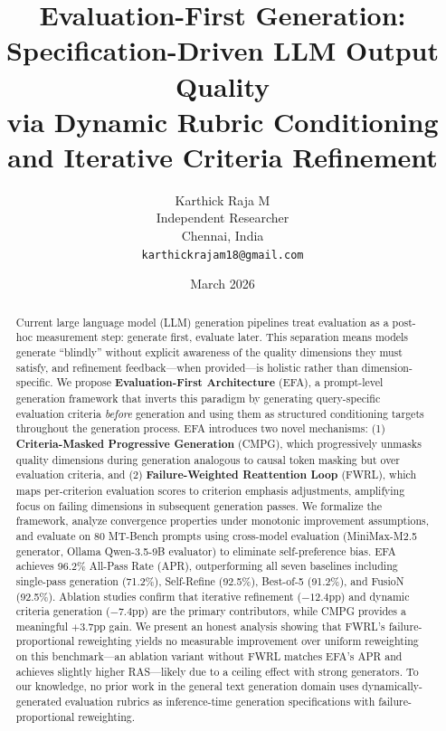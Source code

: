 \documentclass[11pt]{article}
\title{\textbf{Evaluation-First Generation: Specification-Driven LLM Output Quality \\ via Dynamic Rubric Conditioning and Iterative Criteria Refinement}}
\author{
Karthick Raja M \\
Independent Researcher \\
Chennai, India \\
\texttt{karthickrajam18@gmail.com}
}
\date{March 2026}
\newcommand{\efa}{\textsc{EFA}}  %
\newcommand{\cmpg}{\textsc{CMPG}}
\newcommand{\fwrl}{\textsc{FWRL}}
\begin{document}
\maketitle

\begin{abstract}
Current large language model (LLM) generation pipelines treat evaluation as a post-hoc measurement step: generate first, evaluate later. This separation means models generate ``blindly'' without explicit awareness of the quality dimensions they must satisfy, and refinement feedback---when provided---is holistic rather than dimension-specific. We propose \textbf{Evaluation-First Architecture} (\efa{}), a prompt-level generation framework that inverts this paradigm by generating query-specific evaluation criteria \emph{before} generation and using them as structured conditioning targets throughout the generation process. \efa{} introduces two novel mechanisms: (1) \textbf{Criteria-Masked Progressive Generation} (\cmpg{}), which progressively unmasks quality dimensions during generation analogous to causal token masking but over evaluation criteria, and (2) \textbf{Failure-Weighted Reattention Loop} (\fwrl{}), which maps per-criterion evaluation scores to criterion emphasis adjustments, amplifying focus on failing dimensions in subsequent generation passes. We formalize the framework, analyze convergence properties under monotonic improvement assumptions, and evaluate on 80 MT-Bench prompts using cross-model evaluation (MiniMax-M2.5 generator, Ollama Qwen-3.5-9B evaluator) to eliminate self-preference bias. \efa{} achieves 96.2\% All-Pass Rate (APR), outperforming all seven baselines including single-pass generation (71.2\%), Self-Refine (92.5\%), Best-of-5 (91.2\%), and FusioN (92.5\%). Ablation studies confirm that iterative refinement ($-12.4$pp) and dynamic criteria generation ($-7.4$pp) are the primary contributors, while \cmpg{} provides a meaningful $+3.7$pp gain. We present an honest analysis showing that \fwrl{}'s failure-proportional reweighting yields no measurable improvement over uniform reweighting on this benchmark---an ablation variant without \fwrl{} matches \efa{}'s APR and achieves slightly higher RAS---likely due to a ceiling effect with strong generators. To our knowledge, no prior work in the general text generation domain uses dynamically-generated evaluation rubrics as inference-time generation specifications with failure-proportional reweighting.
\end{abstract}
\end{document}
